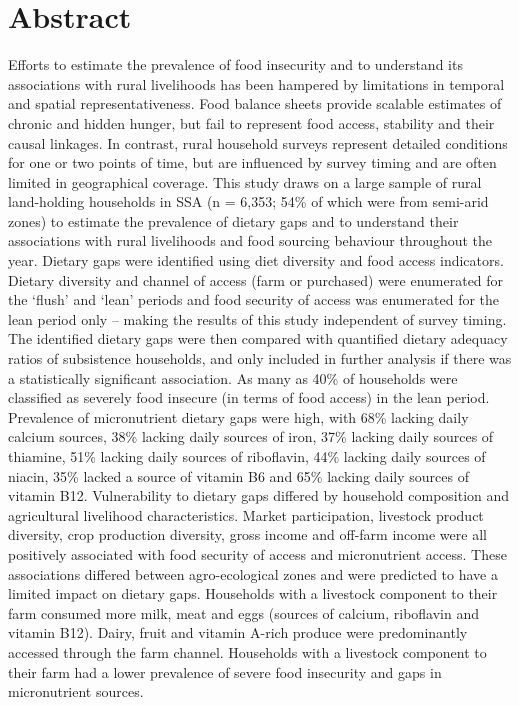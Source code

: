 \section*{Abstract}
Efforts to estimate the prevalence of food insecurity and to understand its associations with rural livelihoods has been hampered by limitations in temporal and spatial representativeness. Food balance sheets provide scalable estimates of chronic and hidden hunger, but fail to represent food access, stability and their causal linkages. In contrast, rural household surveys represent detailed conditions for one or two points of time, but are influenced by survey timing and are often limited in geographical coverage. This study draws on a large sample of rural land-holding households in SSA (n = 6,353; 54\% of which were from semi-arid zones) to estimate the prevalence of dietary gaps and to understand their associations with rural livelihoods and food sourcing behaviour throughout the year. Dietary gaps were identified using diet diversity and food access indicators. Dietary diversity and channel of access (farm or purchased) were enumerated for the `flush' and `lean' periods and food security of access was enumerated for the lean period only -- making the results of this study independent of survey timing. The identified dietary gaps were then compared with quantified dietary adequacy ratios of subsistence households, and only included in further analysis if there was a statistically significant association. As many as 40\% of households were classified as severely food insecure (in terms of food access) in the lean period. Prevalence of micronutrient dietary gaps were high, with 68\% lacking daily calcium sources, 38\% lacking daily sources of iron, 37\% lacking daily sources of thiamine, 51\% lacking daily sources of riboflavin, 44\% lacking daily sources of niacin, 35\% lacked a source of vitamin B6 and 65\% lacking daily sources of vitamin B12. Vulnerability to dietary gaps differed by household composition and agricultural livelihood characteristics. Market participation, livestock product diversity, crop production diversity, gross income and off-farm income were all positively associated with food security of access and micronutrient access. These associations differed between agro-ecological zones and were predicted to have a limited impact on dietary gaps. Households with a livestock component to their farm consumed more milk, meat and eggs (sources of calcium, riboflavin and vitamin B12). Dairy, fruit and vitamin A-rich produce were  predominantly accessed through the farm channel. Households with a livestock component to their farm had a lower prevalence of severe food insecurity and gaps in micronutrient sources.

